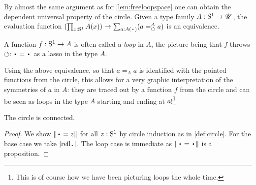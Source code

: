 \begin{remark}\label{rem:dep-univ-prop-circle}
By almost the same argument as for \cref{lem:freeloopspace}
one can obtain the dependent universal property of the circle.
Given a type family $A:{\mathrm{S}^1}\to{\mathscr{U}}$, the evaluation function
$(\prod_{x:\Sc} A(x))\to \sum_{a:A(\base)}(\pathover a A {\Sloop} a)$
is an equivalence.
\end{remark}

\begin{marginfigure}
\end{marginfigure}
\begin{remark}
  A function $f:{\mathrm{S}^1}\to A$ is often called a \emph{loop} in $A$, the
  picture being that $f$ throws $\Sloop:\base=\base$ as a lasso in the
  type $A$.

  Using the above equivalence, so that $a=_Aa$ is identified with the pointed
  functions from the circle, this allows for a very graphic
  interpretation of the symmetries of $a$ in $A$: they are traced out
  by a function $f$ from the circle and can be seen as loops in the type
  $A$ starting and ending at $a$!\footnote{%
    This is of course how we have been
    picturing loops the whole time.}
\end{remark}

\begin{lemma}\label{lem:circleisconnected}
  The circle is connected.
\end{lemma}
\begin{proof}
We show $\Trunc{\base=z}$ for all $z:{\mathrm{S}^1}$ by circle induction
as in \cref{def:circle}.
For the base case we take $\trunc{\refl{\base}}$.
The loop case is immediate as $\Trunc{\base=\base}$ is a proposition.
\end{proof}

